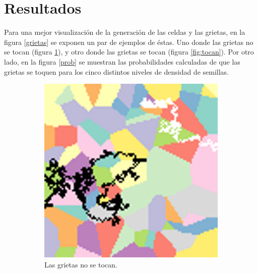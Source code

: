 \documentclass{article}
\begin{document}
\section{Resultados}\label{res}
Para una mejor visualizaci\'on de la generaci\'on de las celdas y las grietas, en la figura \ref{grietas} se exponen un par de ejemplos de \'estas. Uno donde las grietas no se tocan (figura \ref{fig:notocan}), y otro donde las grietas se tocan (figura \ref{fig:tocan}). Por otro lado, en la figura \ref{prob} se muestran las probabilidades calculadas de que las grietas se toquen para los cinco distintos niveles de densidad de semillas.
\begin{figure}
     \centering
     \begin{subfigure}[b]{0.49\textwidth}
         \centering
         \includegraphics[width=\textwidth]{p4pgbn_75_5.png}
         \caption{Las grietas no se tocan.}
         \label{fig:notocan}
     \end{subfigure}
     \begin{subfigure}[b]{0.49\textwidth}
         \centering

\end{subfigure}
\end{figure}
\end{document}
